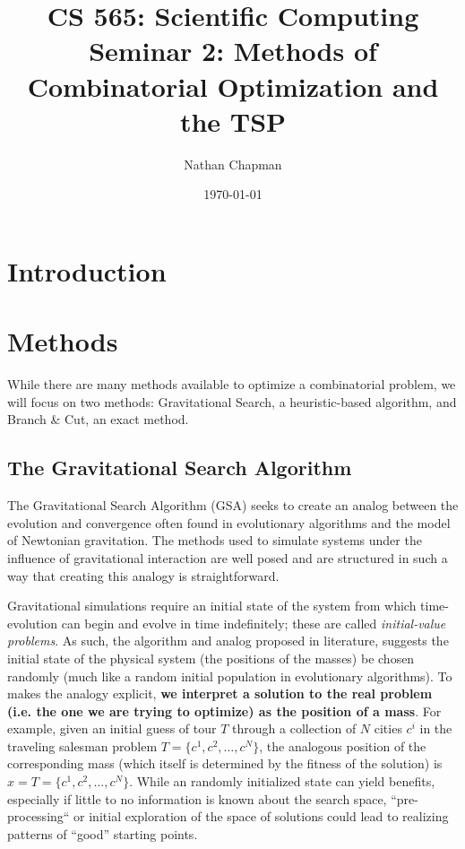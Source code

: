 \documentclass{article}
\title{\vspace*{-0.625in}CS 565: Scientific Computing \\ Seminar 2: Methods of Combinatorial Optimization and the TSP}
\author{Nathan Chapman}
\date{\today}
\begin{document}
    \maketitle

    \section*{Introduction}        

    \section*{Methods}

        While there are many methods available to optimize a combinatorial problem, we will focus on two methods: Gravitational Search, a heuristic-based algorithm, and Branch \& Cut, an exact method.

        \subsection*{The Gravitational Search Algorithm}

            The Gravitational Search Algorithm (GSA) seeks to create an analog between the evolution and convergence often found in evolutionary algorithms and the model of Newtonian gravitation.  The methods used to simulate systems under the influence of gravitational interaction are well posed and are structured in such a way that creating this analogy is straightforward.
            
            Gravitational simulations require an initial state of the system from which time-evolution can begin and evolve in time indefinitely; these are called \emph{initial-value problems}.  As such, the algorithm and analog proposed in literature\cite{GSA}, suggests the initial state of the physical system (the positions of the masses) be chosen randomly (much like a random initial population in evolutionary algorithms).  To makes the analogy explicit, \textbf{we interpret a solution to the real problem (i.e. the one we are trying to optimize) as the position of a mass}.  For example, given an initial guess of tour $T$ through a collection of $N$ cities $c^i$ in the traveling salesman problem $T = \{c^1, c^2, \ldots, c^N\}$, the analogous position of the corresponding mass (which itself is determined by the fitness of the solution) is $x = T = \{c^1, c^2, \ldots, c^N\}$.  While an randomly initialized state can yield benefits, especially if little to no information is known about the search space, ``pre-processing`` or initial exploration of the space of solutions could lead to realizing patterns of ``good'' starting points.
\end{document}
